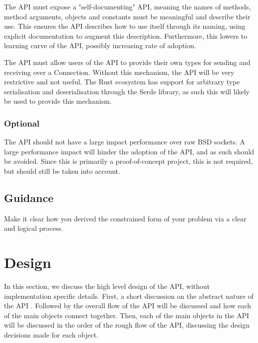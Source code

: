 \documentclass{l4proj}
\begin{document}
The API must expose a "self-documenting" API, meaning the names of methods, method arguments, objects and constants must be
meaningful and describe their use.
This ensures the API describes how to use itself through its naming, using explicit documentation to augment this description.
Furthermore, this lowers to learning curve of the API, possibly increasing rate of adoption.

The API must allow users of the API to provide their own types for sending and receiving over a Connection.
Without this mechanism, the API will be very restrictive and not useful.
The Rust ecosystem has support for arbitrary type serialisation and deserialisation through the Serde library, as such this
will likely be used to provide this mechanism.

\subsection{Optional}\label{subsec:optional2}

The API should not have a large impact performance over raw BSD sockets.
A large performance impact will hinder the adoption of the API, and as such should be avoided.
Since this is primarily a proof-of-concept project, this is not required, but should still be taken into account.

\section{Guidance}\label{sec:guidance}
Make it clear how you derived the constrained form of your problem via a clear and logical process. 

\chapter{Design}\label{ch:design}
In this section, we discuss the high level design of the API, without implementation specific details.
First, a short discussion on the abstract nature of the API .
Followed by the overall flow of the API will be discussed and how each of the main objects connect together.
Then, each of the main objects in the API will be discussed in the order of the rough flow of the API, discussing
the design decisions made for each object.
\end{document}
